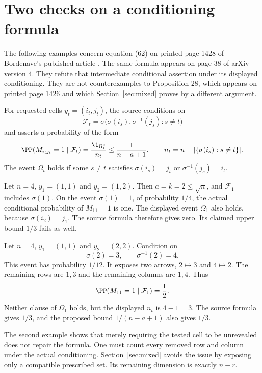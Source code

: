 \section{Two checks on a conditioning formula}\label{sec:conditioning}

The following examples concern equation (62) on printed page 1428 of Bordenave's published article \cite{Bordenave}. The same formula appears on page 38 of arXiv version 4. They refute that intermediate conditional assertion under its displayed conditioning. They are not counterexamples to Proposition 28, which appears on printed page 1426 and which Section~\ref{sec:mixed} proves by a different argument.

For requested cells $y_t=(i_t,j_t)$, the source conditions on
\[
\mathcal F_t=\sigma\bigl(\sigma(i_s),\sigma^{-1}(j_s):s\ne t\bigr)
\]
and asserts a probability of the form
\[
\PP(M_{i_tj_t}=1\mid\mathcal F_t)
=\frac{\1_{\Omega_t^c}}{n_t}\le\frac1{n-a+1},
\qquad
n_t=n-|\{\sigma(i_s):s\ne t\}|.
\]
The event $\Omega_t$ holds if some $s\ne t$ satisfies $\sigma(i_s)=j_t$ or $\sigma^{-1}(j_s)=i_t$.

\begin{example}
Let $n=4$, $y_1=(1,1)$ and $y_2=(1,2)$. Then $a=k=2\le\sqrt n$, and $\mathcal F_1$ includes $\sigma(1)$. On the event $\sigma(1)=1$, of probability $1/4$, the actual conditional probability of $M_{11}=1$ is one. The displayed event $\Omega_1$ also holds, because $\sigma(i_2)=j_1$. The source formula therefore gives zero. Its claimed upper bound $1/3$ fails as well.
\end{example}

\begin{example}
Let $n=4$, $y_1=(1,1)$ and $y_2=(2,2)$. Condition on
\[
\sigma(2)=3,\qquad \sigma^{-1}(2)=4.
\]
This event has probability $1/12$. It exposes two arrows, $2\mapsto3$ and $4\mapsto2$. The remaining rows are $1,3$ and the remaining columns are $1,4$. Thus
\[
\PP(M_{11}=1\mid\mathcal F_1)=\frac12.
\]
Neither clause of $\Omega_1$ holds, but the displayed $n_t$ is $4-1=3$. The source formula gives $1/3$, and the proposed bound $1/(n-a+1)$ also gives $1/3$.
\end{example}

The second example shows that merely requiring the tested cell to be unrevealed does not repair the formula. One must count every removed row and column under the actual conditioning. Section~\ref{sec:mixed} avoids the issue by exposing only a compatible prescribed set. Its remaining dimension is exactly $n-r$.
